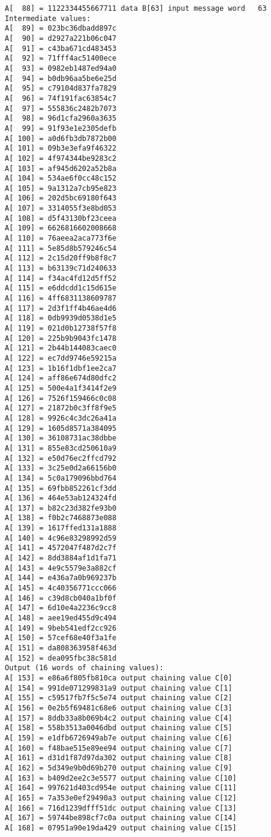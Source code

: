 \begin{verbatim}
A[  88] = 1122334455667711 data B[63] input message word   63
Intermediate values:
A[  89] = 023bc36dbadd897c
A[  90] = d2927a221b06c047
A[  91] = c43ba671cd483453
A[  92] = 71fff4ac51400ece
A[  93] = 0982eb1487ed94a0
A[  94] = b0db96aa5be6e25d
A[  95] = c79104d837fa7829
A[  96] = 74f191fac63854c7
A[  97] = 555836c2482b7073
A[  98] = 96d1cfa2960a3635
A[  99] = 91f93e1e2305defb
A[ 100] = a0d6fb3db7872b00
A[ 101] = 09b3e3efa9f46322
A[ 102] = 4f974344be9283c2
A[ 103] = af945d6202a52b8a
A[ 104] = 534ae6f0cc48c152
A[ 105] = 9a1312a7cb95e823
A[ 106] = 202d5bc69180f643
A[ 107] = 3314055f3e8bd053
A[ 108] = d5f43130bf23ceea
A[ 109] = 6626816602008668
A[ 110] = 76aeea2aca773f6e
A[ 111] = 5e85d8b579246c54
A[ 112] = 2c15d20ff9b8f8c7
A[ 113] = b63139c71d240633
A[ 114] = f34ac4fd12d5ff52
A[ 115] = e6ddcdd1c15d615e
A[ 116] = 4ff6831138609787
A[ 117] = 2d3f1ff4b46ae4d6
A[ 118] = 0db9939d0538d1e5
A[ 119] = 021d0b12738f57f8
A[ 120] = 225b9b9043fc1478
A[ 121] = 2b44b144083caec0
A[ 122] = ec7dd9746e59215a
A[ 123] = 1b16f1dbf1ee2ca7
A[ 124] = aff86e674d80dfc2
A[ 125] = 500e4a1f3414f2e9
A[ 126] = 7526f159466c0c08
A[ 127] = 21872b0c3ff8f9e5
A[ 128] = 9926c4c3dc26a41a
A[ 129] = 1605d8571a384095
A[ 130] = 36108731ac38dbbe
A[ 131] = 855e83cd250610a9
A[ 132] = e50d76ec2ffcd792
A[ 133] = 3c25e0d2a66156b0
A[ 134] = 5c0a179096bbd764
A[ 135] = 69fbb852261cf3dd
A[ 136] = 464e53ab124324fd
A[ 137] = b82c23d382fe93b0
A[ 138] = f0b2c7468873e088
A[ 139] = 1617ffed131a1888
A[ 140] = 4c96e83298992d59
A[ 141] = 4572047f487d2c7f
A[ 142] = 8dd3884af1d1fa71
A[ 143] = 4e9c5579e3a882cf
A[ 144] = e436a7a0b969237b
A[ 145] = 4c40356771ccc066
A[ 146] = c39d8cb040a1bf0f
A[ 147] = 6d10e4a2236c9cc8
A[ 148] = aee19ed455d9c494
A[ 149] = 9beb541edf2cc926
A[ 150] = 57cef68e40f3a1fe
A[ 151] = da808363958f463d
A[ 152] = dea095fbc38c581d
Output (16 words of chaining values):
A[ 153] = e86a6f805fb810ca output chaining value C[0]
A[ 154] = 991de071299831a9 output chaining value C[1]
A[ 155] = c59517fb7f5c5e74 output chaining value C[2]
A[ 156] = 0e2b5f69481c68e6 output chaining value C[3]
A[ 157] = 8ddb33a8b069b4c2 output chaining value C[4]
A[ 158] = 558b3513a0046dbd output chaining value C[5]
A[ 159] = e1dfb6726949ab7e output chaining value C[6]
A[ 160] = f48bae515e89ee94 output chaining value C[7]
A[ 161] = d31d1f87d97da302 output chaining value C[8]
A[ 162] = 5d349e9b0d69b270 output chaining value C[9]
A[ 163] = b409d2ee2c3e5577 output chaining value C[10]
A[ 164] = 997621d403cd954e output chaining value C[11]
A[ 165] = 7a353e0ef29490a3 output chaining value C[12]
A[ 166] = 716d1239dfff51dc output chaining value C[13]
A[ 167] = 59744be898cf7c0a output chaining value C[14]
A[ 168] = 07951a90e19da429 output chaining value C[15]


\end{verbatim}

